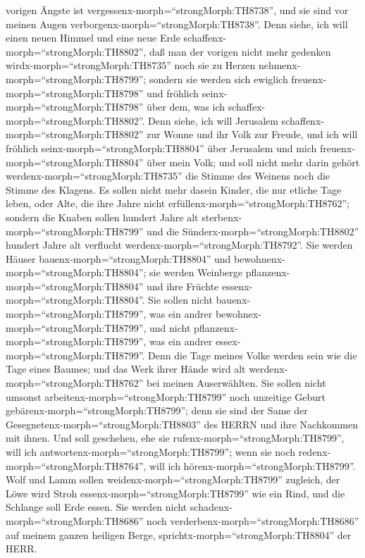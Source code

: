 vorigen Ängste ist vergessenx-morph=``strongMorph:TH8738'', und sie sind
vor meinen Augen verborgenx-morph=``strongMorph:TH8738''. 
Denn siehe, ich will einen neuen Himmel und eine neue Erde
schaffenx-morph=``strongMorph:TH8802'', daß man der vorigen nicht mehr
gedenken wirdx-morph=``strongMorph:TH8735'' noch sie zu Herzen
nehmenx-morph=``strongMorph:TH8799'';  sondern sie werden
sich ewiglich freuenx-morph=``strongMorph:TH8798'' und fröhlich
seinx-morph=``strongMorph:TH8798'' über dem, was ich
schaffex-morph=``strongMorph:TH8802''. Denn siehe, ich will Jerusalem
schaffenx-morph=``strongMorph:TH8802'' zur Wonne und ihr Volk zur
Freude,  und ich will fröhlich
seinx-morph=``strongMorph:TH8804'' über Jerusalem und mich
freuenx-morph=``strongMorph:TH8804'' über mein Volk; und soll nicht mehr
darin gehört werdenx-morph=``strongMorph:TH8735'' die Stimme des Weinens
noch die Stimme des Klagens.  Es sollen nicht mehr dasein
Kinder, die nur etliche Tage leben, oder Alte, die ihre Jahre nicht
erfüllenx-morph=``strongMorph:TH8762''; sondern die Knaben sollen
hundert Jahre alt sterbenx-morph=``strongMorph:TH8799'' und die
Sünderx-morph=``strongMorph:TH8802'' hundert Jahre alt verflucht
werdenx-morph=``strongMorph:TH8792''.  Sie werden Häuser
bauenx-morph=``strongMorph:TH8804'' und
bewohnenx-morph=``strongMorph:TH8804''; sie werden Weinberge
pflanzenx-morph=``strongMorph:TH8804'' und ihre Früchte
essenx-morph=``strongMorph:TH8804''.  Sie sollen nicht
bauenx-morph=``strongMorph:TH8799'', was ein andrer
bewohnex-morph=``strongMorph:TH8799'', und nicht
pflanzenx-morph=``strongMorph:TH8799'', was ein andrer
essex-morph=``strongMorph:TH8799''. Denn die Tage meines Volke werden
sein wie die Tage eines Baumes; und das Werk ihrer Hände wird alt
werdenx-morph=``strongMorph:TH8762'' bei meinen Auserwählten.
 Sie sollen nicht umsonst
arbeitenx-morph=``strongMorph:TH8799'' noch unzeitige Geburt
gebärenx-morph=``strongMorph:TH8799''; denn sie sind der Same der
Gesegnetenx-morph=``strongMorph:TH8803'' des HERRN und ihre Nachkommen
mit ihnen.  Und soll geschehen, ehe sie
rufenx-morph=``strongMorph:TH8799'', will ich
antwortenx-morph=``strongMorph:TH8799''; wenn sie noch
redenx-morph=``strongMorph:TH8764'', will ich
hörenx-morph=``strongMorph:TH8799''.  Wolf und Lamm sollen
weidenx-morph=``strongMorph:TH8799'' zugleich, der Löwe wird Stroh
essenx-morph=``strongMorph:TH8799'' wie ein Rind, und die Schlange soll
Erde essen. Sie werden nicht schadenx-morph=``strongMorph:TH8686'' noch
verderbenx-morph=``strongMorph:TH8686'' auf meinem ganzen heiligen
Berge, sprichtx-morph=``strongMorph:TH8804'' der HERR.

